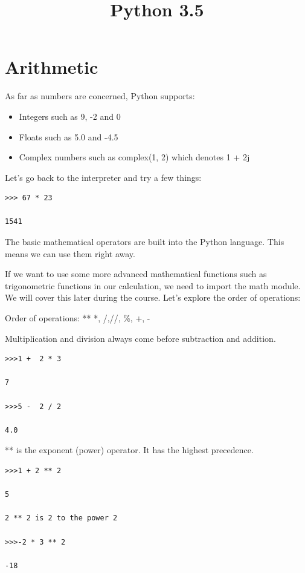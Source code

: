 \documentclass{article}
\title{Python 3.5}
\begin{document}
\maketitle 

\tableofcontents

\section{Arithmetic}
\lstset{language=Python}

As far as numbers are concerned, Python supports:

\begin{itemize}
	\item Integers such as 9, -2 and 0
	\item Floats such as 5.0 and -4.5
	\item Complex numbers such as complex(1, 2)  	which denotes 1 + 2j
\end{itemize}

Let's go back to the interpreter and try a few things:

\begin{lstlisting}
>>> 67 * 23 

1541
\end{lstlisting}

The basic mathematical operators are built into the Python language. This means we can use them right away. 
 
If we want to use some more advanced mathematical functions such as trigonometric functions in our calculation, we need to import the math module. We will cover this later during the course.
Let’s explore the order of operations:

Order of operations: **  *, /,//, \%, +, -

Multiplication and division always come before subtraction and addition. 

\begin{lstlisting}
>>>1 +  2 * 3

7

>>>5 -  2 / 2

4.0
\end{lstlisting}

** is the exponent (power) operator.  It has the highest precedence.

\begin{lstlisting}
>>>1 + 2 ** 2

5

2 ** 2 is 2 to the power 2

>>>-2 * 3 ** 2

-18
\end{lstlisting}
\end{document}
